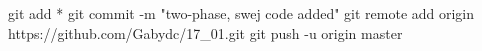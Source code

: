 git add *
git commit -m "two-phase, swej code added"
git remote add origin https://github.com/Gabydc/17_01.git
git push -u origin master
